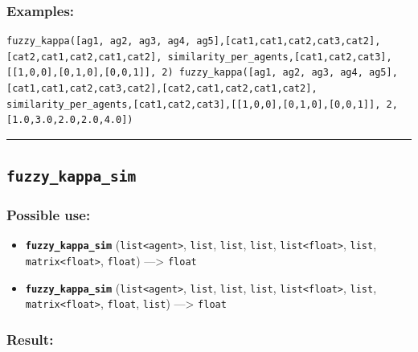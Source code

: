 \documentclass[]{book}
\providecommand{\tightlist}{%
  \setlength{\itemsep}{0pt}\setlength{\parskip}{0pt}}
\theoremstyle{definition}
\theoremstyle{definition}
\theoremstyle{definition}
\theoremstyle{remark}
\begin{document}
\subsubsection{Examples:}\label{examples-131}

\begin{verbatim}
fuzzy_kappa([ag1, ag2, ag3, ag4, ag5],[cat1,cat1,cat2,cat3,cat2],[cat2,cat1,cat2,cat1,cat2], similarity_per_agents,[cat1,cat2,cat3],[[1,0,0],[0,1,0],[0,0,1]], 2) fuzzy_kappa([ag1, ag2, ag3, ag4, ag5],[cat1,cat1,cat2,cat3,cat2],[cat2,cat1,cat2,cat1,cat2], similarity_per_agents,[cat1,cat2,cat3],[[1,0,0],[0,1,0],[0,0,1]], 2, [1.0,3.0,2.0,2.0,4.0]) 
\end{verbatim}

\begin{center}\rule{0.5\linewidth}{\linethickness}\end{center}

\subsection{\texorpdfstring{\texttt{fuzzy\_kappa\_sim}}{fuzzy\_kappa\_sim}}\label{fuzzy_kappa_sim}

\subsubsection{Possible use:}\label{possible-use-177}

\begin{itemize}
\tightlist
\item
  \textbf{\texttt{fuzzy\_kappa\_sim}}
  (\texttt{list\textless{}agent\textgreater{}}, \texttt{list},
  \texttt{list}, \texttt{list},
  \texttt{list\textless{}float\textgreater{}}, \texttt{list},
  \texttt{matrix\textless{}float\textgreater{}}, \texttt{float})
  ---\textgreater{} \texttt{float}
\item
  \textbf{\texttt{fuzzy\_kappa\_sim}}
  (\texttt{list\textless{}agent\textgreater{}}, \texttt{list},
  \texttt{list}, \texttt{list},
  \texttt{list\textless{}float\textgreater{}}, \texttt{list},
  \texttt{matrix\textless{}float\textgreater{}}, \texttt{float},
  \texttt{list}) ---\textgreater{} \texttt{float}
\end{itemize}

\subsubsection{Result:}\label{result-171}
\end{document}
